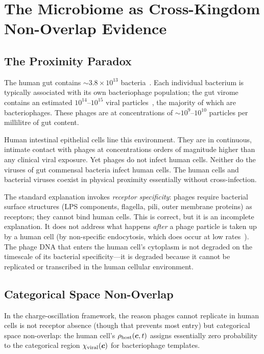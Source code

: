 \section{The Microbiome as Cross-Kingdom Non-Overlap Evidence}
\label{v:sec:microbiome}

\subsection{The Proximity Paradox}

The human gut contains $\sim\!3.8 \times 10^{13}$ bacteria~\cite{Sender2016}. Each individual bacterium is typically associated with its own bacteriophage population; the gut virome contains an estimated $10^{14}$--$10^{15}$ viral particles~\cite{Reyes2010,Virgin2014,Minot2011}, the majority of which are bacteriophages. These phages are at concentrations of $\sim\!10^9$--$10^{10}$ particles per millilitre of gut content.

Human intestinal epithelial cells line this environment. They are in continuous, intimate contact with phages at concentrations orders of magnitude higher than any clinical viral exposure. Yet phages do not infect human cells. Neither do the viruses of gut commensal bacteria infect human cells. The human cells and bacterial viruses coexist in physical proximity essentially without cross-infection.

The standard explanation invokes \emph{receptor specificity}: phages require bacterial surface structures (LPS components, flagella, pili, outer membrane proteins) as receptors; they cannot bind human cells. This is correct, but it is an incomplete explanation. It does not address what happens \emph{after} a phage particle is taken up by a human cell (by non-specific endocytosis, which does occur at low rates~\cite{Nguyen2017,Barr2013}). The phage DNA that enters the human cell's cytoplasm is not degraded on the timescale of its bacterial specificity---it is degraded because it cannot be replicated or transcribed in the human cellular environment.

\subsection{Categorical Space Non-Overlap}

In the charge-oscillation framework, the reason phages cannot replicate in human cells is not receptor absence (though that prevents most entry) but categorical space non-overlap: the human cell's $\rho_{\mathrm{host}}(\boldsymbol{c}, t)$ assigns essentially zero probability to the categorical region $\chi_{\mathrm{viral}}(\boldsymbol{c})$ for bacteriophage templates.


